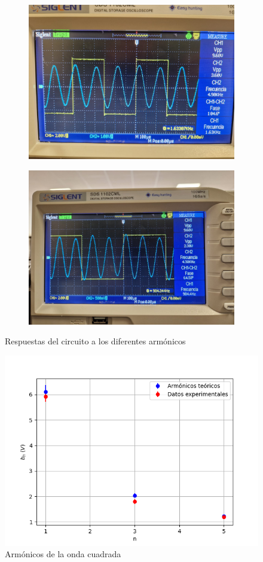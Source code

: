 \documentclass[a4paper,12pt,titlepage]{article}
\begin{document}
\begin{figure}[h!]
    \centering
    \begin{subfigure}{0.49\textwidth}
        \centering
        \includegraphics[width=0.75\linewidth]{fourier/onda cuadrada/cuadrada3.jpg}
    \end{subfigure}
    \begin{subfigure}{0.49\textwidth}
        \centering
        \includegraphics[width=0.75\linewidth]{fourier/onda cuadrada/cuadrada2.jpg}
    \end{subfigure}
    \caption{Respuestas del circuito a los diferentes armónicos}
    \label{fig:enter-label}
\end{figure}

\begin{figure}[h!]
    \centering
    \includegraphics[width=0.515\linewidth]{fourier/arm_cuadrada.png}
    \caption{Armónicos de la onda cuadrada}
    \label{fig:enter-label}
\end{figure}
\end{document}
